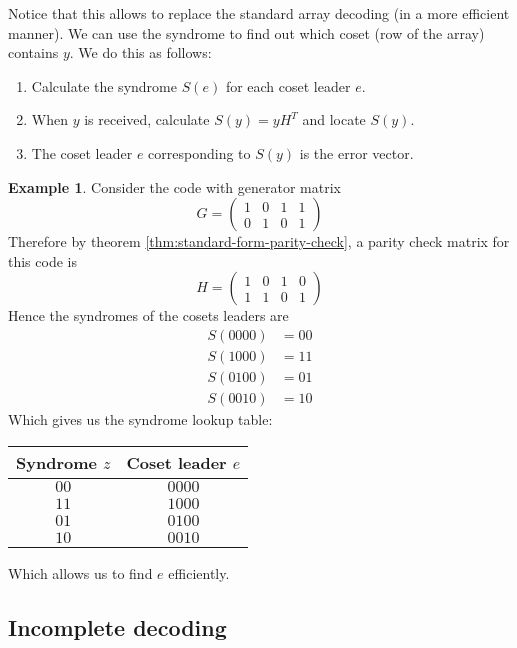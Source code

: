 \documentclass[11pt,a4paper]{article}
\theoremstyle{definition}
\newtheorem{example}[definition]{Example}
\theoremstyle{plain}
\theoremstyle{remark}
\begin{document}
Notice that this allows to replace the standard array decoding (in a more efficient manner). 
We can use the syndrome to find out which coset (row of the array)
contains $y$. We do this as follows: 
\begin{enumerate}[label = \roman*)]
    \item Calculate the syndrome $S(e)$ for each coset leader $e$. 
    \item When $y$ is received, calculate $S(y) = y H^T$ and locate $S(y)$. 
    \item The coset leader $e$ corresponding to $S(y)$ is the error vector.
\end{enumerate}

\begin{example}
    Consider the code with generator matrix 
    $$G = \begin{pmatrix}
        1 & 0 & 1 & 1 \\
        0 & 1 & 0 & 1
    \end{pmatrix}$$
    Therefore by theorem \ref{thm:standard-form-parity-check}, a parity check matrix for this code is
    $$ H = \begin{pmatrix}
        1 & 0 & 1 & 0 \\
        1 & 1 & 0 & 1
    \end{pmatrix}$$
    Hence the syndromes of the cosets leaders are 
    \begin{align*}
        S(0000) &= 00 \\
        S(1000) &= 11 \\
        S(0100) &= 01 \\
        S(0010) &= 10
    \end{align*}
    Which gives us the syndrome lookup table: 
    \begin{table}[H]
        \centering
        \begin{tabular}{cc}
            \hline
            Syndrome $z$ & Coset leader $e$ \\
            \hline 
            $00$ & $0000$ \\
            $11$ & $1000$ \\
            $01$ & $0100$ \\
            $10$ & $0010$ 
        \end{tabular}
    \end{table}
    Which allows us to find $e$ efficiently. 
\end{example}

\subsection{Incomplete decoding} 
\end{document}
